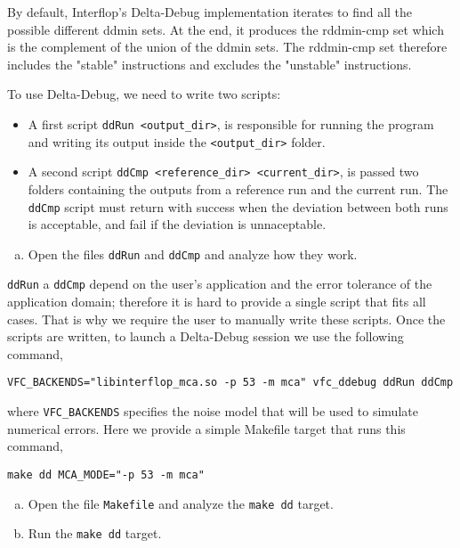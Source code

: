 By default, Interflop's Delta-Debug implementation iterates to find all the
possible different ddmin sets. At the end, it produces the rddmin-cmp set which
is the complement of the union of the ddmin sets. The rddmin-cmp set therefore
includes the "stable" instructions and excludes the "unstable" instructions.

To use Delta-Debug, we need to write two scripts: \begin{itemize}
  \item A first script \texttt{ddRun <output\_dir>}, is responsible for running the program and writing its output inside the \texttt{<output\_dir>} folder.
  \item A second script \texttt{ddCmp <reference\_dir> <current\_dir>}, is passed two folders containing the outputs from a reference run and the current run. The \texttt{ddCmp} script must return with success when the deviation between both runs is acceptable, and fail if the deviation is unnaceptable.
\end{itemize}

\begin{question}
  \begin{enumerate}[(a)]
    \item Open the files \texttt{ddRun} and \texttt{ddCmp} and analyze how they work.
  \end{enumerate}
\end{question}

\texttt{ddRun} a \texttt{ddCmp} depend on the user's application and the error tolerance
of the application domain; therefore it is hard to provide a single script that fits all cases. That is why we require the user to manually write these scripts. Once the scripts
are written, to launch a Delta-Debug session we use the following command,

\begin{verbatim}
VFC_BACKENDS="libinterflop_mca.so -p 53 -m mca" vfc_ddebug ddRun ddCmp
\end{verbatim}

where \texttt{VFC\_BACKENDS} specifies the noise model that will be used to
simulate numerical errors. Here we provide a simple Makefile target that
runs this command,
\begin{verbatim}
make dd MCA_MODE="-p 53 -m mca"
\end{verbatim}

\begin{question}
  \begin{enumerate}[(a)]
    \item Open the file \texttt{Makefile} and analyze the \texttt{make dd} target.
    \item Run the \texttt{make dd} target.
  \end{enumerate}
\end{question}

